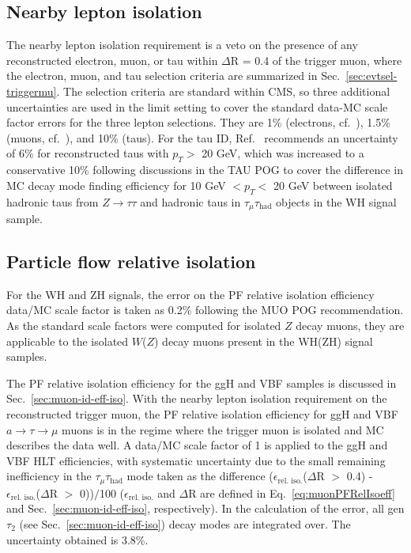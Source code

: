 \subsection{Nearby lepton isolation\label{lepideff-leptonveto}}

The nearby lepton isolation requirement is a veto on the presence of any reconstructed electron, muon, or tau within $\Delta$R = 0.4 of the trigger muon, where the electron, muon, and tau selection criteria are summarized in Sec.~\ref{sec:evtsel-triggermu}.  The selection criteria are standard within CMS, so three additional uncertainties are used in the limit setting to cover the standard data-MC scale factor errors for the three lepton selections.  They are 1\% (electrons, cf.~\cite{CMS:egammauncertaintytwiki}), 1.5\% (muons, cf.~\cite{CMS:muonuncertaintytwiki}), and 10\% (taus).  For the tau ID, Ref.~\cite{CMS:tauuncertaintytwiki} recommends an uncertainty of 6\% for reconstructed taus with $p_T >$ 20 GeV, which was increased to a conservative 10\% following discussions in the TAU POG to cover the difference in MC decay mode finding efficiency for 10 GeV $< p_T <$ 20 GeV between isolated hadronic taus from $Z\rightarrow\tau\tau$ and hadronic taus in $\tau_{\mu}\tau_{\text{had}}$ objects in the WH signal sample.

\subsection{Particle flow relative isolation\label{lepideff-iso}}

For the WH and ZH signals, the error on the PF relative isolation efficiency data/MC scale factor is taken as 0.2\% following the MUO POG recommendation.  As the standard scale factors were computed for isolated $Z$ decay muons, they are applicable to the isolated $W$($Z$) decay muons present in the WH(ZH) signal samples.

The PF relative isolation efficiency for the ggH and VBF samples is discussed in Sec.~\ref{sec:muon-id-eff-iso}. With the nearby lepton isolation requirement on the reconstructed trigger muon, the PF relative isolation efficiency for ggH and VBF $a\rightarrow\tau\rightarrow\mu$ muons is in the regime where the trigger muon is isolated and MC describes the data well.  A data/MC scale factor of 1 is applied to the ggH and VBF HLT efficiencies, with systematic uncertainty due to the small remaining inefficiency in the $\tau_{\mu}\tau_{\text{had}}$ mode taken as the difference ($\epsilon_{\text{rel. iso.}}$($\Delta$R $>$ 0.4) - $\epsilon_{\text{rel. iso.}}$($\Delta$R $>$ 0))$/$100 ($\epsilon_{\text{rel. iso.}}$ and $\Delta$R are defined in Eq.~\ref{eq:muonPFRelIsoeff} and Sec.~\ref{sec:muon-id-eff-iso}, respectively).  In the calculation of the error, all gen $\tau_{\text{2}}$ (see Sec.~\ref{sec:muon-id-eff-iso}) decay modes are integrated over.  The uncertainty obtained is 3.8\%.

